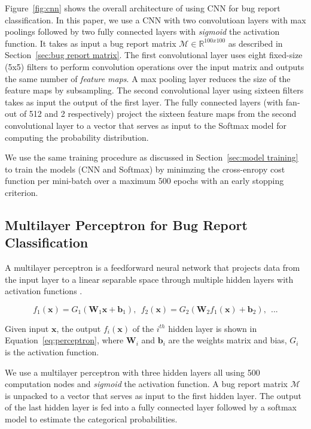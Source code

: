 Figure~\ref{fig:cnn} shows the overall architecture of using CNN for bug report classification. In this paper, we use a CNN with two convolutioan layers with max poolings followed by two fully connected layers with \textit{sigmoid} the activation function. It takes as input a bug report matrix $\mathcal{M} \in \mathbb{R}^{100x100}$ as described in Section~\ref{sec:bug report matrix}. The first convolutional layer uses eight fixed-size (5x5) filters to perform convolution operations over the input matrix and outputs the same number of \textit{feature maps}. A max pooling layer reduces the size of the feature maps by subsampling. The second convolutional layer using sixteen filters takes as input the output of the first layer. The fully connected layers (with fan-out of 512 and 2 respectively) project the sixteen feature maps from the second convolutional layer to a vector that serves as input to the Softmax model for computing the probability distribution.

We use the same training procedure as discussed in Section~\ref{sec:model training} to train the models (CNN and Softmax) by minimzing the cross-enropy cost function per mini-batch over a maximum 500 epochs with an early stopping criterion. 

\subsection{Multilayer Perceptron for Bug Report Classification}
\label{sec:perceptron}
A multilayer perceptron is a feedforward neural network that projects data from the input layer to a linear separable space through multiple hidden layers with activation functions \cite{Hornik:1989:MFN:70405.70408}.

\begin{equation}
  f_1(\mathbf{x}) = G_1(\mathbf{W}_1\mathbf{x} + \mathbf{b}_1), \:\: f_2(\mathbf{x}) = G_2(\mathbf{W}_2 f_1(\mathbf{x}) + \mathbf{b}_2), \:\: ...
\label{eq:perceptron}
\end{equation}

Given input $\mathbf{x}$, the output $f_i(\mathbf{x})$ of the $i^{th}$ hidden layer is shown in Equation~\ref{eq:perceptron}, where $\mathbf{W}_i$ and $\mathbf{b}_i$ are the weights matrix and bias, $G_i$ is the activation function.

We use a multilayer perceptron with three hidden layers all using 500 computation nodes and \textit{sigmoid} the activation function. A bug report matrix $\mathcal{M}$ is unpacked to a vector that serves as input to the first hidden layer. The output of the last hidden layer is fed into a fully connected layer followed by a softmax model to estimate the categorical probabilities.

